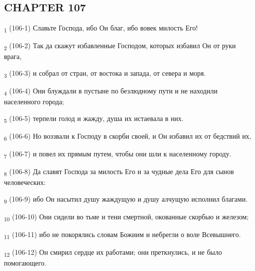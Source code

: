 \subsection{CHAPTER 107}
\begin{tcolorbox}
\textsubscript{1} (106-1) Славьте Господа, ибо Он благ, ибо вовек милость Его!
\end{tcolorbox}
\begin{tcolorbox}
\textsubscript{2} (106-2) Так да скажут избавленные Господом, которых избавил Он от руки врага,
\end{tcolorbox}
\begin{tcolorbox}
\textsubscript{3} (106-3) и собрал от стран, от востока и запада, от севера и моря.
\end{tcolorbox}
\begin{tcolorbox}
\textsubscript{4} (106-4) Они блуждали в пустыне по безлюдному пути и не находили населенного города;
\end{tcolorbox}
\begin{tcolorbox}
\textsubscript{5} (106-5) терпели голод и жажду, душа их истаевала в них.
\end{tcolorbox}
\begin{tcolorbox}
\textsubscript{6} (106-6) Но воззвали к Господу в скорби своей, и Он избавил их от бедствий их,
\end{tcolorbox}
\begin{tcolorbox}
\textsubscript{7} (106-7) и повел их прямым путем, чтобы они шли к населенному городу.
\end{tcolorbox}
\begin{tcolorbox}
\textsubscript{8} (106-8) Да славят Господа за милость Его и за чудные дела Его для сынов человеческих:
\end{tcolorbox}
\begin{tcolorbox}
\textsubscript{9} (106-9) ибо Он насытил душу жаждущую и душу алчущую исполнил благами.
\end{tcolorbox}
\begin{tcolorbox}
\textsubscript{10} (106-10) Они сидели во тьме и тени смертной, окованные скорбью и железом;
\end{tcolorbox}
\begin{tcolorbox}
\textsubscript{11} (106-11) ибо не покорялись словам Божиим и небрегли о воле Всевышнего.
\end{tcolorbox}
\begin{tcolorbox}
\textsubscript{12} (106-12) Он смирил сердце их работами; они преткнулись, и не было помогающего.
\end{tcolorbox}
